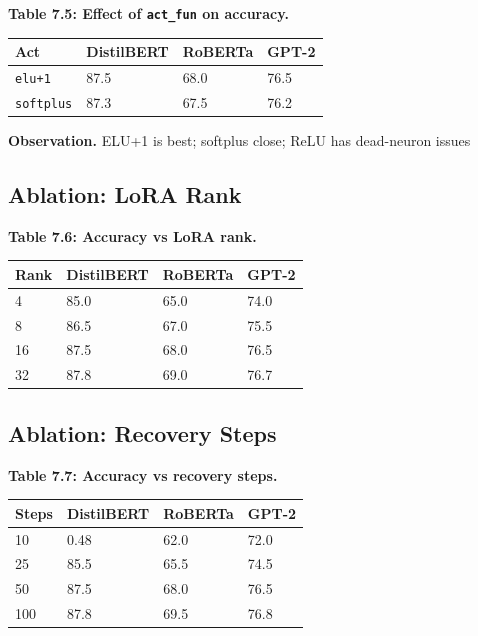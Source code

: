 \textbf{Table 7.5: Effect of \texttt{act\_fun} on accuracy.}

\begin{table}[H]
\centering
\small
\begin{tabular}{llll}
\toprule
\textbf{Act} & \textbf{DistilBERT} & \textbf{RoBERTa} & \textbf{GPT-2} \\
\midrule
\texttt{elu+1} & 87.5 & 68.0 & 76.5 \\
\texttt{softplus} & 87.3 & 67.5 & 76.2 \\
\bottomrule
\end{tabular}
\end{table}

\textbf{Observation.} ELU+1 is best; softplus close; ReLU has dead-neuron issues

\subsection{Ablation: LoRA Rank}

\textbf{Table 7.6: Accuracy vs LoRA rank.}

\begin{table}[H]
\centering
\small
\begin{tabular}{llll}
\toprule
\textbf{Rank} & \textbf{DistilBERT} & \textbf{RoBERTa} & \textbf{GPT-2} \\
\midrule
4 & 85.0 & 65.0 & 74.0 \\
8 & 86.5 & 67.0 & 75.5 \\
16 & 87.5 & 68.0 & 76.5 \\
32 & 87.8 & 69.0 & 76.7 \\
\bottomrule
\end{tabular}
\end{table}

\subsection{Ablation: Recovery Steps}

\textbf{Table 7.7: Accuracy vs recovery steps.}

\begin{table}[H]
\centering
\small
\begin{tabular}{llll}
\toprule
\textbf{Steps} & \textbf{DistilBERT} & \textbf{RoBERTa} & \textbf{GPT-2} \\
\midrule
10 & 0.48 & 62.0 & 72.0 \\
25 & 85.5 & 65.5 & 74.5 \\
50 & 87.5 & 68.0 & 76.5 \\
100 & 87.8 & 69.5 & 76.8 \\
\bottomrule
\end{tabular}
\end{table}


